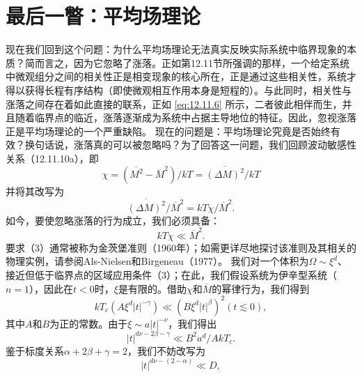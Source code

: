 \section{最后一瞥：平均场理论}\label{ux6700ux540eux4e00ux77a5ux5e73ux5747ux573aux7406ux8bba}
现在我们回到这个问题：为什么平均场理论无法真实反映实际系统中临界现象的本质？简而言之，因为它忽略了涨落。正如第12.11节所强调的那样，一个给定系统中微观组分之间的相关性正是相变现象的核心所在，正是通过这些相关性，系统才得以获得长程有序结构（即使微观相互作用本身是短程的）。与此同时，相关性与涨落之间存在着如此直接的联系，正如 \autoref{eq:12.11.6} 所示，二者彼此相伴而生，并且随着临界点的临近，涨落逐渐成为系统中占据主导地位的特征。因此，忽视涨落正是平均场理论的一个严重缺陷。
现在的问题是：平均场理论究竟是否始终有效？换句话说，涨落真的可以被忽略吗？为了回答这一问题，我们回顾波动敏感性关系（12.11.10a），即
\begin{equation}\tag{12.13.1}\label{eq:12.13.1}
\chi = ( \overline { { M ^{2} } } - \overline { { M } } ^{2} ) / k T = \overline { { ( \Delta M ) ^{2} } } / k T
\end{equation}
并将其改写为
\begin{equation}\tag{12.13.2}\label{eq:12.13.2}
\overline { { ( \Delta M ) ^{2} } } / \overline { { M } } ^{2} = k T \chi / \overline { { M } } ^{2} .
\end{equation}
如今，要使忽略涨落的行为成立，我们必须具备：
\begin{equation}\tag{12.13.3}\label{eq:12.13.3}
k T \chi \ll \overline { { { M } } } ^{2} .
\end{equation}
要求（3）通常被称为金茨堡准则（1960年）；如需更详尽地探讨该准则及其相关的物理实例，请参阅Als-Nielsen和Birgeneau（1977）。
我们对一个体积为\(\Omega \sim \xi^{d}\)、接近但低于临界点的区域应用条件（3）；在此，我们假设系统为伊辛型系统（\(n=1\)），因此在\(t<0\)时，\(\xi\)是有限的。借助\(\chi\)和\(\overline{M}\)的幂律行为，我们得到
\begin{equation}\tag{12.13.4}\label{eq:12.13.4}
k T _ { c } ( A \xi ^{d} | t | ^{- \gamma} ) \ll ( B \xi ^{d} | t | ^{\beta} ) ^{2}  ( t \lesssim 0 ) ,
\end{equation}
其中\(A\)和\(B\)为正的常数。由于\(\xi \sim a|t|^{-\nu}\)，我们得出
\begin{equation}\tag{12.13.5}\label{eq:12.13.5}
| t | ^{d \nu - 2 \beta - \gamma} \ll B ^{2} a ^{d} / A k T _ { c } .
\end{equation}
鉴于标度关系\(\alpha + 2\beta + \gamma = 2\)，我们不妨改写为
\begin{equation}\tag{12.13.6}\label{eq:12.13.6}
| t | ^{d \nu - ( 2 - \alpha )} \ll D ,
\end{equation}
